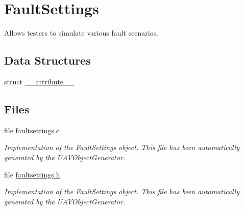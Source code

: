 \hypertarget{group___fault_settings}{\section{\-Fault\-Settings}
\label{group___fault_settings}
}


\-Allows testers to simulate various fault scenarios.  


\subsection*{\-Data \-Structures}
\begin{DoxyCompactItemize}
\item 
struct \hyperlink{struct____attribute____}{\-\_\-\-\_\-attribute\-\_\-\-\_\-}
\end{DoxyCompactItemize}
\subsection*{\-Files}
\begin{DoxyCompactItemize}
\item 
file \hyperlink{faultsettings_8c}{faultsettings.\-c}
\begin{DoxyCompactList}\small\item\em \-Implementation of the \-Fault\-Settings object. \-This file has been automatically generated by the \-U\-A\-V\-Object\-Generator. \end{DoxyCompactList}\item 
file \hyperlink{faultsettings_8h}{faultsettings.\-h}
\begin{DoxyCompactList}\small\item\em \-Implementation of the \-Fault\-Settings object. \-This file has been automatically generated by the \-U\-A\-V\-Object\-Generator. \end{DoxyCompactList}\end{DoxyCompactItemize}
